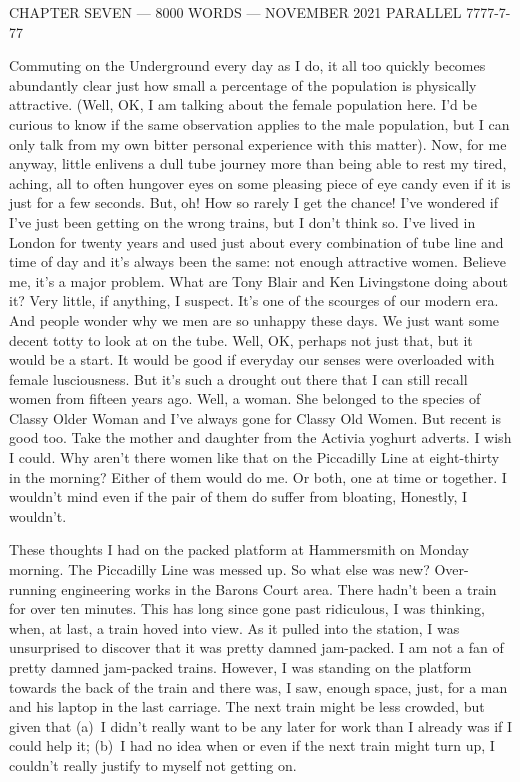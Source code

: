 {\parindent=0pt {\obeylines
{\twelvess CHAPTER SEVEN --- 8000 WORDS --- NOVEMBER 2021}
{\twelvess PARALLEL 7777-7-77}}
\vskip 1cm

\twelverm
Commuting on the Underground every day as I do, it all too quickly
becomes abundantly clear just how small a percentage of the
population is physically attractive. (Well, OK, I am talking about
the female population here. I'd be curious to know if the same
observation applies to the male population, but I can only talk from my
own bitter personal experience with this matter). Now, for me
anyway, little enlivens a dull tube journey more than being able to
rest my tired, aching, all to often hungover eyes on some pleasing
piece of eye candy even if it is just for a few seconds. But, oh!
How so rarely I get the chance! I've wondered if I've just been getting on the wrong trains,
but I don't think so. I've lived in London for twenty years and used
just about every combination of tube line and time of day and it's
always been the same: not enough attractive women. Believe me, it's
a major problem. What are Tony Blair and Ken Livingstone doing about
it? Very little, if anything, I suspect. It's one of the scourges of
our modern era. And people wonder why we men are so unhappy these
days. We just want some decent totty to look at on the tube. Well,
OK, perhaps not {\twelveit just\/} that, but it would be a start. It would be good if
everyday our senses were overloaded with female lusciousness.
But it's such a drought out there that I can still recall women
from fifteen years ago. Well, {\twelveit a\/} woman. She belonged to
the species of Classy Older Woman and I've always gone for Classy
Old Women. But recent is good too. Take the mother and daughter from
the Activia yoghurt adverts. I wish I could. Why aren't there women
like that on the Piccadilly Line at eight-thirty in the morning?
Either of them would do me. Or both, one at time or together. I
wouldn't mind even if the pair of them do suffer from bloating,
Honestly, I wouldn't.}

These thoughts I had on the packed platform at Hammersmith on Monday
morning. The Piccadilly Line was messed up. So what else was new?
Over-running engineering works in the Barons Court area. There
hadn't been a train for over ten minutes. This has long since gone
past ridiculous, I was thinking, when, at last, a train hoved into
view. As it pulled into the station, I was unsurprised to discover
that it was pretty damned jam-packed. I am not a fan of pretty damned
jam-packed trains. However, I was standing on the platform towards the
back of the train and there was, I saw, enough space, just, for a
man and his laptop in the last carriage. The next train might be
less crowded, but given that (a)~I didn't really want to be any
later for work than I already was if I could help it; (b)~I had no
idea when or even if the next train might turn up, I couldn't really
justify to myself not getting on.

